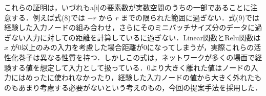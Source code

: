 これらの証明は，いづれもa[i]の要素数が実数空間のうちの一部であることに注意する．例えば式(8)では $ -r $ から $ r $ までの限られた範囲に過ぎない．式(9)では経験した入力ノードの組み合わせ，さらにそのミニバッチサイズ分のデータに過ぎない入力に対しての距離を計算しているに過ぎない．Linear関数とRelu関数は $ x $ が0以上のみの入力を考慮した場合距離が0になってしまうが，実際これらの活性化巻子は異なる性質を持つ．しかしこの式は，ネットワークが多くの場面で経験する値を想定して入力として扱っている．0より大きく離れた値はノードの入力にはめったに使われなかったり，経験した入力ノードの値から大きく外れたものもあまり考慮する必要がないという考えのもの，今回の提案手法を採用した．